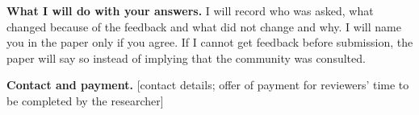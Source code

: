 \documentclass[11pt]{article}
\begin{document}
\textbf{What I will do with your answers.} I will record who was asked, what changed because of the feedback and what did not change and why. I will name you
in the paper only if you agree. If I cannot get feedback before submission, the paper will say so instead of implying that the community was consulted.

\textbf{Contact and payment.} [contact details; offer of payment for reviewers' time to be completed by the researcher]
\end{document}
